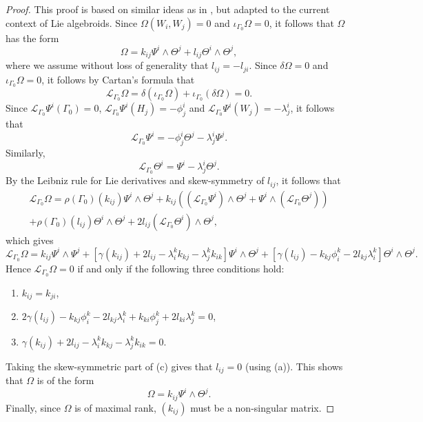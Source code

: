 \documentclass[11pt]{article}
\theoremstyle{plain}
\theoremstyle{definition}
\begin{document}
\begin{proof}
This proof is based on similar ideas as in \cite{crampin1984geohelmholtz}, but adapted to the current context of Lie algebroids. Since $\Omega(W_i,W_j)=0$ and $\iota_{\Gamma_0} \Omega=0$, it follows that $\Omega$ has the form
\begin{equation*}
    \Omega=k_{ij}\Psi^i\wedge \Theta^j+l_{ij}\Theta^i\wedge \Theta^j,
\end{equation*}
where we assume without loss of generality that $l_{ij}=-l_{ji}$. Since $\delta \Omega=0$ and $\iota_{\Gamma_0}\Omega=0$, it follows by Cartan's formula that
\begin{equation*}
    \mathcal{L}_{\Gamma_0}\Omega=\delta(\iota_{\Gamma_0}\Omega)+\iota_{\Gamma_0}(\delta \Omega)=0.
\end{equation*}
Since $\mathcal{L}_{\Gamma_0}\Psi^i(\Gamma_0)=0$, $\mathcal{L}_{\Gamma_0}\Psi^i(H_j)=-\phi_j^i$ and $\mathcal{L}_{\Gamma_0}\Psi^i(W_j)=-\lambda_j^i$, it follows that
\begin{equation*}
    \mathcal{L}_{\Gamma_0}\Psi^i=-\phi_j^i\Theta^j-\lambda_j^i\Psi^j.
\end{equation*}
Similarly,
\begin{equation*}
    \mathcal{L}_{\Gamma_0}\Theta^i=\Psi^i-\lambda_j^i \Theta^j.
\end{equation*}
By the Leibniz rule for Lie derivatives and skew-symmetry of $l_{ij}$, it follows that
\begin{multline*}
    \mathcal{L}_{\Gamma_0}\Omega=\rho(\Gamma_0)(k_{ij})\Psi^i\wedge \Theta^j+k_{ij}\left((\mathcal{L}_{\Gamma_0}\Psi^i)\wedge \Theta^j+\Psi^i\wedge (\mathcal{L}_{\Gamma_0}\Theta^j)\right)\\+\rho(\Gamma_0)(l_{ij})\Theta^i\wedge \Theta^j+2l_{ij}(\mathcal{L}_{\Gamma_0}\Theta^i)\wedge \Theta^j,
\end{multline*}
which gives
\begin{equation*}
    \mathcal{L}_{\Gamma_0}\Omega=k_{ij}\Psi^i\wedge \Psi^j+\left[\gamma(k_{ij})+2l_{ij}-\lambda_i^k k_{kj}-\lambda_j^k k_{ik}\right]\Psi^i\wedge \Theta^j+\left[\gamma(l_{ij})-k_{kj}\phi_i^k-2l_{kj}\lambda_i^k \right]\Theta^i\wedge \Theta^j.
\end{equation*}
Hence $\mathcal{L}_{\Gamma_0}\Omega=0$ if and only if the following three conditions hold:
\begin{enumerate}[label=(\alph*)]
    \item $k_{ij}=k_{ji}$,
    \item $2\gamma(l_{ij})-k_{kj}\phi_i^k-2l_{kj}\lambda_i^k+k_{ki}\phi_j^k+2l_{ki}\lambda_j^k=0$,
    \item $\gamma(k_{ij})+2l_{ij}-\lambda_i^k k_{kj}-\lambda_j^k k_{ik}=0$.
\end{enumerate}
Taking the skew-symmetric part of (c) gives that $l_{ij}=0$ (using (a)). This shows that $\Omega$ is of the form
\begin{equation*}
    \Omega=k_{ij}\Psi^i\wedge \Theta^j.
\end{equation*}
Finally, since $\Omega$ is of maximal rank, $(k_{ij})$ must be a non-singular matrix.
\end{proof}
\end{document}
